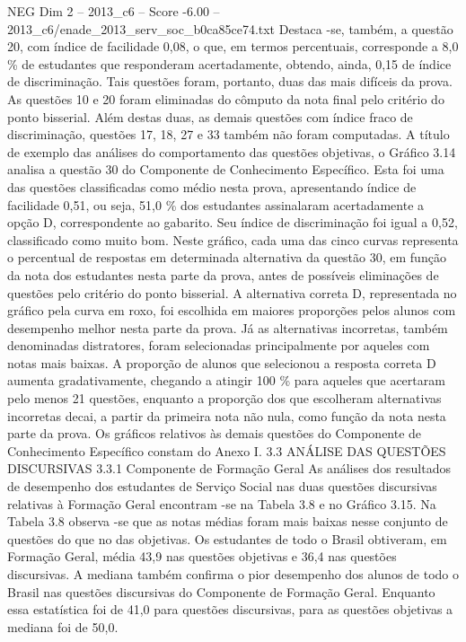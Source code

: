\begin{textsample}{NEG Dim 2 – 2013\_c6 – Score -6.00 – 2013\_c6/enade\_2013\_serv\_soc\_b0ca85ce74.txt}
Destaca -se, também, a questão 20, com índice de facilidade 0,08, o que, em termos percentuais, corresponde a 8,0 \% de estudantes que responderam acertadamente, obtendo, ainda, 0,15 de índice de discriminação.
Tais questões foram, portanto, duas das mais difíceis da prova.
As questões 10 e 20 foram eliminadas do cômputo da nota final pelo critério do ponto bisserial.
Além destas duas, as demais questões com índice fraco de discriminação, questões 17, 18, 27 e 33 também não foram computadas.
A título de exemplo das análises do comportamento das questões objetivas, o Gráfico 3.14 analisa a questão 30 do Componente de Conhecimento Específico.
Esta foi uma das questões classificadas como médio nesta prova, apresentando índice de facilidade 0,51, ou seja, 51,0 \% dos estudantes assinalaram acertadamente a opção D, correspondente ao gabarito.
Seu índice de discriminação foi igual a 0,52, classificado como muito bom.
Neste gráfico, cada uma das cinco curvas representa o percentual de respostas em determinada alternativa da questão 30, em função da nota dos estudantes nesta parte da prova, antes de possíveis eliminações de questões pelo critério do ponto bisserial.
A alternativa correta D, representada no gráfico pela curva em roxo, foi escolhida em maiores proporções pelos alunos com desempenho melhor nesta parte da prova.
Já as alternativas incorretas, também denominadas distratores, foram selecionadas principalmente por aqueles com notas mais baixas.
A proporção de alunos que selecionou a resposta correta D aumenta gradativamente, chegando a atingir 100 \% para aqueles que acertaram pelo menos 21 questões, enquanto a proporção dos que escolheram alternativas incorretas decai, a partir da primeira nota não nula, como função da nota nesta parte da prova.
Os gráficos relativos às demais questões do Componente de Conhecimento Específico constam do Anexo I. 3.3 ANÁLISE DAS QUESTÕES DISCURSIVAS 3.3.1 Componente de Formação Geral As análises dos resultados de desempenho dos estudantes de Serviço Social nas duas questões discursivas relativas à Formação Geral encontram -se na Tabela 3.8 e no Gráfico 3.15.
Na Tabela 3.8 observa -se que as notas médias foram mais baixas nesse conjunto de questões do que no das objetivas.
Os estudantes de todo o Brasil obtiveram, em Formação Geral, média 43,9 nas questões objetivas e 36,4 nas questões discursivas.
A mediana também confirma o pior desempenho dos alunos de todo o Brasil nas questões discursivas do Componente de Formação Geral.
Enquanto essa estatística foi de 41,0 para questões discursivas, para as questões objetivas a mediana foi de 50,0.

\end{textsample}
